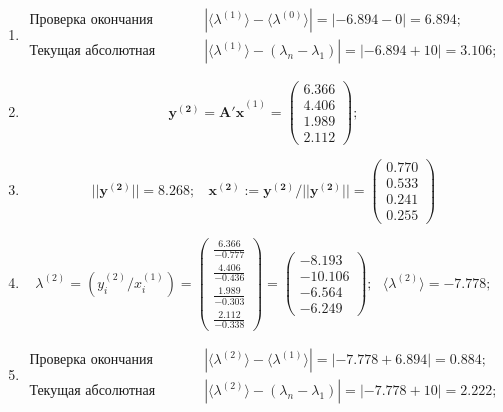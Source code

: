 \begin{enumerate}
\item $$
    \begin{matrix}
        \text{Проверка окончания алгоритма: }&|\langle\lambda^{(1)}\rangle - \langle\lambda^{(0)}\rangle| = |-6.894 - 0| =  \mathbf{6.894};\\
        \text{Текущая абсолютная ошибка: }&|\langle\lambda^{(1)}\rangle - (\lambda_n-\lambda_1)| = |-6.894 + 10| = \mathbf{3.106};
    \end{matrix}$$



\item $$
    \mathbf{y^{(2)} =A'x}^{(1)} = \begin{pmatrix} 6.366\\4.406\\1.989\\2.112\end{pmatrix};$$

\item $$
||\mathbf{y^{(2)}}|| = 8.268; ~~~~
    \mathbf{x^{(2)}}:=\mathbf{y^{(2)}}/||\mathbf{y^{(2)}}|| =
    \begin{pmatrix} 0.770\\0.533\\0.241\\0.255\end{pmatrix}$$

\item $$
    \lambda^{(2)} =\left( y^{(2)}_i / x^{(1)}_i \right) =
    \begin{pmatrix} \frac{6.366}{-0.777}\\\frac{4.406}{-0.436}\\\frac{1.989}{-0.303}\\\frac{2.112}{-0.338}\end{pmatrix}=
    \begin{pmatrix}-8.193\\-10.106\\-6.564\\-6.249\end{pmatrix}; ~~~
    \langle\lambda^{(2)}\rangle = -7.778;$$

\item $$
    \begin{matrix}
        \text{Проверка окончания алгоритма: }&|\langle\lambda^{(2)}\rangle - \langle\lambda^{(1)}\rangle| = |-7.778+6.894| =    \mathbf{0.884};\\
        \text{Текущая абсолютная ошибка: }&|\langle\lambda^{(2)}\rangle - (\lambda_n-\lambda_1)| = |-7.778 + 10| = \mathbf{2.222};
    \end{matrix}$$





\end{enumerate}
